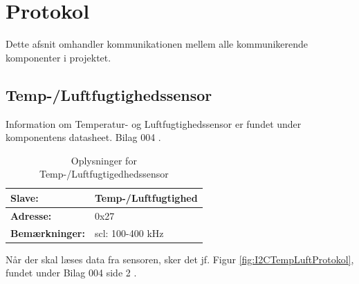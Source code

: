 \section{\IIC Protokol} \label{sec:I2C_protokol}
Dette afsnit omhandler kommunikationen mellem alle \IIC kommunikerende komponenter i projektet.

\subsection{Temp-/Luftfugtighedssensor}
Information om Temperatur- og Luftfugtighedssensor er fundet under komponentens datasheet. Bilag 004 \cite{lib:TempHum_I2C}.

\begin{table}[h]
\centering
\begin{tabularx}{0.6\textwidth}{| X | X |} 			\hline
\textbf{Slave:} 		& Temp-/Luftfugtighed		\\ \hline
\textbf{Adresse:}		& 0x27						\\ \hline
\textbf{Bemærkninger:}	& scl: 100-400 kHz			\\ \hline
\end{tabularx}
\caption{\IIC Oplysninger for Temp-/Luftfugtigedhedssensor}
\label{tbl:I2CTempLuftOplysninger}
\end{table}


Når der skal læses data fra sensoren, sker det jf. Figur \ref{fig:I2CTempLuftProtokol}, fundet under Bilag 004 side 2 \cite{lib:TempHum_I2C}.


